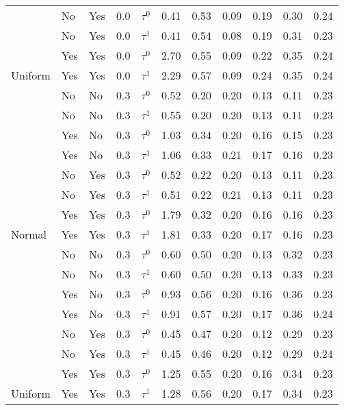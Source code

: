 \begin{tabular}[t]{lllrlrrrrrr}
 & No & Yes & 0.0 & $\tau^0$ & 0.41 & 0.53 & 0.09 & 0.19 & 0.30 & 0.24\\

 & No & Yes & 0.0 & $\tau^1$ & 0.41 & 0.54 & 0.08 & 0.19 & 0.31 & 0.23\\

 & Yes & Yes & 0.0 & $\tau^0$ & 2.70 & 0.55 & 0.09 & 0.22 & 0.35 & 0.24\\

\multirow{-8}{*}{\raggedright\arraybackslash Uniform} & Yes & Yes & 0.0 & $\tau^1$ & 2.29 & 0.57 & 0.09 & 0.24 & 0.35 & 0.24\\
\cmidrule{1-11}
 & No & No & 0.3 & $\tau^0$ & 0.52 & 0.20 & 0.20 & 0.13 & 0.11 & 0.23\\

 & No & No & 0.3 & $\tau^1$ & 0.55 & 0.20 & 0.20 & 0.13 & 0.11 & 0.23\\

 & Yes & No & 0.3 & $\tau^0$ & 1.03 & 0.34 & 0.20 & 0.16 & 0.15 & 0.23\\

 & Yes & No & 0.3 & $\tau^1$ & 1.06 & 0.33 & 0.21 & 0.17 & 0.16 & 0.23\\

 & No & Yes & 0.3 & $\tau^0$ & 0.52 & 0.22 & 0.20 & 0.13 & 0.11 & 0.23\\

 & No & Yes & 0.3 & $\tau^1$ & 0.51 & 0.22 & 0.21 & 0.13 & 0.11 & 0.23\\

 & Yes & Yes & 0.3 & $\tau^0$ & 1.79 & 0.32 & 0.20 & 0.16 & 0.16 & 0.23\\

\multirow{-8}{*}{\raggedright\arraybackslash Normal} & Yes & Yes & 0.3 & $\tau^1$ & 1.81 & 0.33 & 0.20 & 0.17 & 0.16 & 0.23\\
\cmidrule{1-11}
 & No & No & 0.3 & $\tau^0$ & 0.60 & 0.50 & 0.20 & 0.13 & 0.32 & 0.23\\

 & No & No & 0.3 & $\tau^1$ & 0.60 & 0.50 & 0.20 & 0.13 & 0.33 & 0.23\\

 & Yes & No & 0.3 & $\tau^0$ & 0.93 & 0.56 & 0.20 & 0.16 & 0.36 & 0.23\\

 & Yes & No & 0.3 & $\tau^1$ & 0.91 & 0.57 & 0.20 & 0.17 & 0.36 & 0.24\\

 & No & Yes & 0.3 & $\tau^0$ & 0.45 & 0.47 & 0.20 & 0.12 & 0.29 & 0.23\\

 & No & Yes & 0.3 & $\tau^1$ & 0.45 & 0.46 & 0.20 & 0.12 & 0.29 & 0.24\\

 & Yes & Yes & 0.3 & $\tau^0$ & 1.25 & 0.55 & 0.20 & 0.16 & 0.34 & 0.23\\

\multirow{-8}{*}{\raggedright\arraybackslash Uniform} & Yes & Yes & 0.3 & $\tau^1$ & 1.28 & 0.56 & 0.20 & 0.17 & 0.34 & 0.23\\
\bottomrule
\end{tabular}
